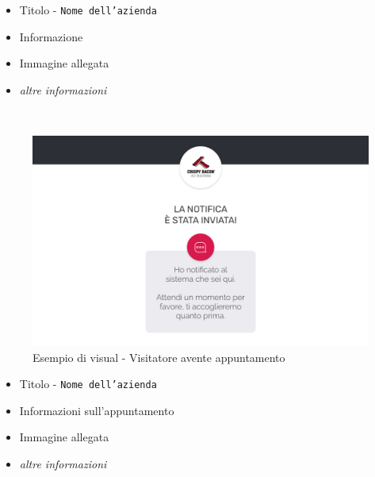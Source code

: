 \begin{minipage}{0.5\textwidth}
	\begin{itemize}  
		\item Titolo - \texttt{Nome dell'azienda}
		\item Informazione
		\item Immagine allegata
		\item \textit{altre informazioni}
	\end{itemize}
\end{minipage}
\\[0.4cm]
\begin{minipage}{0.47\textwidth}
	\begin{figure}[H]
		\includegraphics[width=1\columnwidth]{immagini/incontri_gui.jpg}
		\caption{\label{fig:esempioGUI4}Esempio di visual - Visitatore avente appuntamento}
	\end{figure}
\end{minipage}
\begin{minipage}{0.5\textwidth}
	\begin{itemize}  
		\item Titolo - \texttt{Nome dell'azienda}
		\item Informazioni sull'appuntamento
		\item Immagine allegata
		\item \textit{altre informazioni}
	\end{itemize}
\end{minipage}

\newpage
